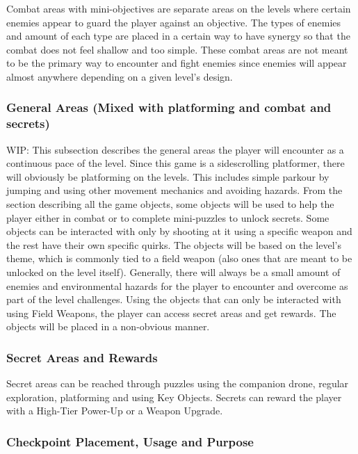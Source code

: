 \documentclass[12pt]{article}
\begin{document}
Combat areas with mini-objectives are separate areas on the levels where certain enemies appear to guard the player against an objective. The types of enemies and amount of each type are placed in a certain way to have synergy so that the combat does not feel shallow and too simple. These combat areas are not meant to be the primary way to encounter and fight enemies since enemies will appear almost anywhere depending on a given level's design. 

\subsubsection{General Areas (Mixed with platforming and combat and secrets)}

WIP: This subsection describes the general areas the player will encounter as a continuous pace of the level. Since this game is a sidescrolling platformer, there will obviously be platforming on the levels. This includes simple parkour by jumping and using other movement mechanics and avoiding hazards. From the section describing all the game objects, some objects will be used to help the player either in combat or to complete mini-puzzles to unlock secrets. Some objects can be interacted with only by shooting at it using a specific weapon and the rest have their own specific quirks. The objects will be based on the level's theme, which is commonly tied to a field weapon (also ones that are meant to be unlocked on the level itself). Generally, there will always be a small amount of enemies and environmental hazards for the player to encounter and overcome as part of the level challenges. Using the objects that can only be interacted with using Field Weapons, the player can access secret areas and get rewards. The objects will be placed in a non-obvious manner. 

\subsubsection{Secret Areas and Rewards}

Secret areas can be reached through puzzles using the companion drone, regular exploration, platforming and using Key Objects. Secrets can reward the player with a High-Tier Power-Up or a Weapon Upgrade.

\subsubsection{Checkpoint Placement, Usage and Purpose}
\end{document}
